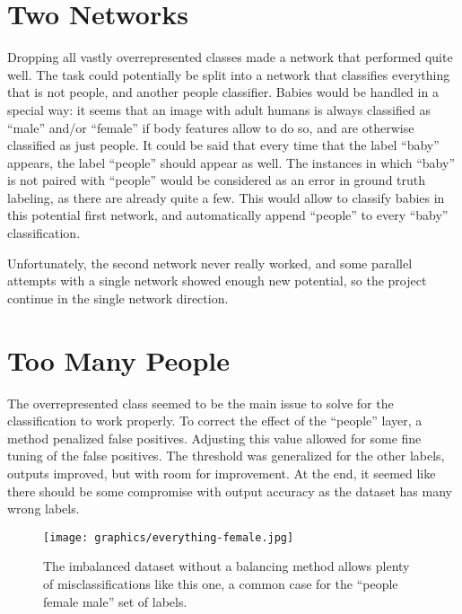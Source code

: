 \documentclass{article}
\begin{document}
\section{Two Networks}
Dropping all vastly overrepresented classes made a network that performed quite well.
The task could potentially be split into a network that classifies everything that is not people, and another people classifier.
Babies would be handled in a special way: it seems that an image with adult humans is always classified as ``male'' and/or ``female'' if body features allow to do so, and are otherwise classified as just people.
It could be said that every time that the label ``baby'' appears, the label ``people'' should appear as well.
The instances in which ``baby'' is not paired with ``people'' would be considered as an error in ground truth labeling, as there are already quite a few.
This would allow to classify babies in this potential first network, and automatically append ``people'' to every ``baby'' classification.

Unfortunately, the second network never really worked, and some parallel attempts with a single network showed enough new potential, so the project continue in the single network direction.


\section{Too Many People}
The overrepresented class seemed to be the main issue to solve for the classification to work properly.
To correct the effect of the ``people'' layer, a method penalized false positives.
Adjusting this value allowed for some fine tuning of the false positives.
The threshold was generalized for the other labels, outputs improved, but with room for improvement.
At the end, it seemed like there should be some compromise with output accuracy as the dataset has many wrong labels.

\begin{figure}[ht]
  \centering
  \texttt{[image: graphics/everything-female.jpg]}
  \caption{The imbalanced dataset without a balancing method allows plenty of misclassifications like this one, a common case for the ``people female male'' set of labels.}
\end{figure}
\end{document}
